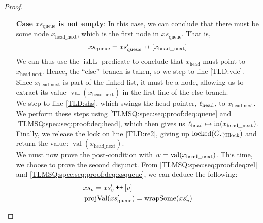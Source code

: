 \documentclass[a4paper, 10pt]{report}
\theoremstyle{definition}
\newcommand{\locked}{\operatorname{locked}}
\newcommand{\isqueueseq}{\operatorname{isQueue_{S}}}
\newcommand{\vq}{v_q}
\newcommand{\xsqueue}{xs_{\mathrm{queue}}}
\newcommand{\isLL}{\operatorname{isLL}}
\newcommand{\projval}{\operatorname{projVal}}
\newcommand{\wrapsome}{\operatorname{wrapSome}}
\newcommand{\locN}[1]{\loc_{\mathrm{#1}}}
\newcommand{\lochead}{\locN{head}}
\newcommand{\nodeval}{\valB}
\newcommand{\nIn}[1]{\operatorname{in}(#1)}
\newcommand{\nVal}[1]{\operatorname{val}(#1)}
\newcommand{\node}{x}
\newcommand{\nodeN}[1]{\node_{\mathrm{#1}}}
\newcommand{\nodehead}{\nodeN{head}}
\newcommand{\nodeheadnext}{\nodeN{head\_next}}
\newcommand{\absvalue}{\val}
\newcommand{\absvalueList}{xs_v}
\newcommand{\Qg}{G}
\newcommand{\ghlock}{\gname_{\mathrm{Hlock}}}
\newcommand\catenate{\mathbin{\text{\ttfamily\upshape ++}}}
\begin{document}
\begin{proof}
\begin{itemize}
  In this case, \ref{TLMSQ:spec:seq:proof:deq:isLL} simply asserts $\isLL [\nodehead]$, which, by definition, tells us that $\nodehead \mapsto \None$. Hence, the ``if'' on line \ref{TLD:ifn} takes the ``then'' branch, so we step to line \ref{TLD:re1}. Here, we release the lock, giving up $\locked(\Qg.\ghlock)$, and return $\None$ on the following line. What remains is to prove the post-condition with $\nodeval = \None$. We can easily do this by proving the first disjunction. From \ref{TLMSQ:spec:seq:proof:deq:rel} with the fact that $\xsqueue = []$ we can conclude that $\absvalueList$ is empty, and since we have not modified the queue, we can prove $\isqueueseq(\vq, \absvalueList, \Qg)$ using the same resources we got from the pre-condition.

  \item[\textbf{Case}] \textbf{$\xsqueue$ is not empty}:
  In this case, we can conclude that there must be some node $\nodeheadnext$, which is the first node in $\xsqueue$. That is,
  \begin{equation}
    \xsqueue = \xsqueue' \catenate [\nodeheadnext]\label{TLMSQ:spec:seq:proof:deq:xsqueue}
  \end{equation}
  We can thus use the $\isLL$ predicate to conclude that $\nodehead$ must point to $\nodeheadnext$. Hence, the ``else'' branch is taken, so we step to line \ref{TLD:vde}. Since $\nodeheadnext$ is part of the linked list, it must be a node, allowing us to extract its value $\nVal{\nodeheadnext}$ in the first line of the else branch.\\
  We step to line \ref{TLD:shs}, which swings the head pointer, $\lochead$, to $\nodeheadnext$. We perform these steps using \ref{TLMSQ:spec:seq:proof:deq:queue} and \ref{TLMSQ:spec:seq:proof:deq:head}, which then gives us $\lochead \mapsto \nIn{\nodeheadnext}$.\\
  Finally, we release the lock on line \ref{TLD:re2}, giving up $\locked(\Qg.\ghlock)$ and return the value: $\nVal{\nodeheadnext}$.\\
  We must now prove the post-condition with $\nodeval = \nVal{\nodeheadnext}$. This time, we choose to prove the second disjunct. From \ref{TLMSQ:spec:seq:proof:deq:rel} and \ref{TLMSQ:spec:seq:proof:deq:xsqueue}, we can deduce the following:
  \begin{align}
    &\absvalueList = \absvalueList' \catenate [\absvalue]\label{TLMSQ:spec:seq:proof:deq:absval}\\
    &\projval(\xsqueue') = \wrapsome(\absvalueList')\label{TLMSQ:spec:seq:proof:deq:rel'}\\

\end{align}
\end{itemize}
\end{proof}
\end{document}
